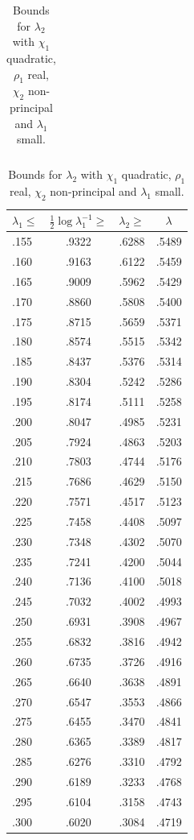 \documentclass[12pt,psamsfonts]{amsart}
\theoremstyle{definition}
\theoremstyle{remark}
\numberwithin{equation}{section}
\begin{document}
\begin{table}
\begin{tabular}{l|c|c|c}
\end{tabular}
 \qquad
 \begin{tabular}{l|c|c|c} 
 $\lambda_1 \leq$ & $\tfrac{1}{2}\log \lambda_1^{-1} \geq$ & $\lambda_2 \geq$ & $\lambda$ \\
 \hline 
 .155 &  .9322 &  .6288 &  .5489 \\ 
 .160 &  .9163 &  .6122 &  .5459 \\ 
 .165 &  .9009 &  .5962 &  .5429 \\ 
 .170 &  .8860 &  .5808 &  .5400 \\ 
 .175 &  .8715 &  .5659 &  .5371 \\ 
 .180 &  .8574 &  .5515 &  .5342 \\ 
 .185 &  .8437 &  .5376 &  .5314 \\ 
 .190 &  .8304 &  .5242 &  .5286 \\ 
 .195 &  .8174 &  .5111 &  .5258 \\ 
 .200 &  .8047 &  .4985 &  .5231 \\ 
 .205 &  .7924 &  .4863 &  .5203 \\ 
 .210 &  .7803 &  .4744 &  .5176 \\ 
 .215 &  .7686 &  .4629 &  .5150 \\ 
 .220 &  .7571 &  .4517 &  .5123 \\ 
 .225 &  .7458 &  .4408 &  .5097 \\ 
 .230 &  .7348 &  .4302 &  .5070 \\ 
 .235 &  .7241 &  .4200 &  .5044 \\ 
 .240 &  .7136 &  .4100 &  .5018 \\ 
 .245 &  .7032 &  .4002 &  .4993 \\ 
 .250 &  .6931 &  .3908 &  .4967 \\ 
 .255 &  .6832 &  .3816 &  .4942 \\ 
 .260 &  .6735 &  .3726 &  .4916 \\ 
 .265 &  .6640 &  .3638 &  .4891 \\ 
 .270 &  .6547 &  .3553 &  .4866 \\ 
 .275 &  .6455 &  .3470 &  .4841 \\ 
 .280 &  .6365 &  .3389 &  .4817 \\ 
 .285 &  .6276 &  .3310 &  .4792 \\ 
 .290 &  .6189 &  .3233 &  .4768 \\ 
 .295 &  .6104 &  .3158 &  .4743 \\ 
 .300 &  .6020 &  .3084 &  .4719 \\ 
\end{tabular}
\caption{Bounds for $\lambda_2$ with $\chi_1$ quadratic, $\rho_1$ real,  $\chi_2$ non-principal and $\lambda_1$ small.}
\label{Table-SZ-L1L2small-Chi1Chi2NonPrincipal}
\end{table}
\end{document}
